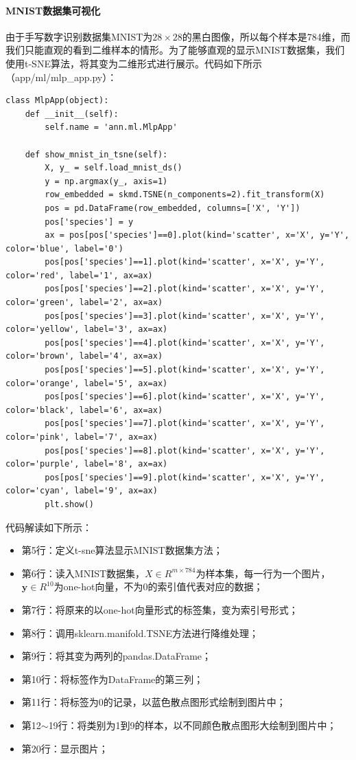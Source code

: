 \documentclass[UTF8]{article}
\begin{document}
\paragraph{MNIST数据集可视化}
由于手写数字识别数据集MNIST为$28 \times 28$的黑白图像，所以每个样本是784维，而我们只能直观的看到二维样本的情形。为了能够直观的显示MNIST数据集，我们使用t-SNE算法，将其变为二维形式进行展示。代码如下所示（app/ml/mlp\_app.py）：
\begin{lstlisting}
class MlpApp(object):
    def __init__(self):
        self.name = 'ann.ml.MlpApp'
    
    def show_mnist_in_tsne(self):
        X, y_ = self.load_mnist_ds()
        y = np.argmax(y_, axis=1)
        row_embedded = skmd.TSNE(n_components=2).fit_transform(X)
        pos = pd.DataFrame(row_embedded, columns=['X', 'Y'])
        pos['species'] = y
        ax = pos[pos['species']==0].plot(kind='scatter', x='X', y='Y', color='blue', label='0')
        pos[pos['species']==1].plot(kind='scatter', x='X', y='Y', color='red', label='1', ax=ax)
        pos[pos['species']==2].plot(kind='scatter', x='X', y='Y', color='green', label='2', ax=ax)
        pos[pos['species']==3].plot(kind='scatter', x='X', y='Y', color='yellow', label='3', ax=ax)
        pos[pos['species']==4].plot(kind='scatter', x='X', y='Y', color='brown', label='4', ax=ax)
        pos[pos['species']==5].plot(kind='scatter', x='X', y='Y', color='orange', label='5', ax=ax)
        pos[pos['species']==6].plot(kind='scatter', x='X', y='Y', color='black', label='6', ax=ax)
        pos[pos['species']==7].plot(kind='scatter', x='X', y='Y', color='pink', label='7', ax=ax)
        pos[pos['species']==8].plot(kind='scatter', x='X', y='Y', color='purple', label='8', ax=ax)
        pos[pos['species']==9].plot(kind='scatter', x='X', y='Y', color='cyan', label='9', ax=ax)
        plt.show()
\end{lstlisting}
代码解读如下所示：
\begin{itemize}
\item 第5行：定义t-sne算法显示MNIST数据集方法；
\item 第6行：读入MNIST数据集，$X \in R^{m \times 784}$为样本集，每一行为一个图片，$\boldsymbol{y} \in R^{10}$为one-hot向量，不为0的索引值代表对应的数据；
\item 第7行：将原来的以one-hot向量形式的标签集，变为索引号形式；
\item 第8行：调用sklearn.manifold.TSNE方法进行降维处理；
\item 第9行：将其变为两列的pandas.DataFrame；
\item 第10行：将标签作为DataFrame的第三列；
\item 第11行：将标签为0的记录，以蓝色散点图形式绘制到图片中；
\item 第12$\sim$19行：将类别为1到9的样本，以不同颜色散点图形大绘制到图片中；
\item 第20行：显示图片；
\end{itemize}
\end{document}
